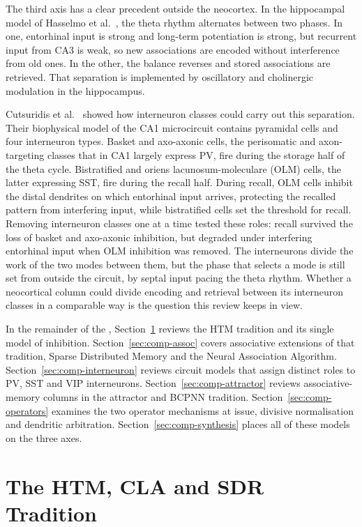 The third axis has a clear precedent outside the neocortex. In the hippocampal
model of Hasselmo et al.~\cite{hasselmo2002theta}, the theta rhythm
alternates between two phases. In one, entorhinal input is strong and
long-term potentiation is strong, but recurrent input from CA3 is weak, so new
associations are encoded without interference from old ones. In the other, the
balance reverses and stored associations are retrieved. That separation is
implemented by oscillatory and cholinergic modulation in the hippocampus.

Cutsuridis et al.~\cite{cutsuridis2010encoding} showed how interneuron classes
could carry out this separation. Their biophysical model of the CA1 microcircuit
contains pyramidal cells and four interneuron types. Basket and axo-axonic
cells, the perisomatic and axon-targeting classes that in CA1 largely express
PV, fire during the storage half of the theta cycle. Bistratified and oriens
lacunosum-moleculare (OLM) cells, the latter expressing SST, fire during the
recall half. During recall, OLM cells inhibit the distal dendrites on which
entorhinal input arrives, protecting the recalled pattern from interfering
input, while bistratified cells set the threshold for recall. Removing
interneuron classes one at a time tested these roles: recall survived the loss
of basket and axo-axonic inhibition, but degraded under interfering entorhinal
input when OLM inhibition was removed. The interneurons divide the work of the
two modes between them, but the phase that selects a mode is still set from
outside the circuit, by septal input pacing the theta rhythm. Whether a
neocortical column could divide encoding and retrieval between its interneuron
classes in a comparable way is the question this review keeps in view.

In the remainder of the \unitname{}, Section~\ref{sec:comp-htm} reviews the HTM
tradition and its single model of inhibition. Section~\ref{sec:comp-assoc}
covers associative extensions of that tradition, Sparse Distributed Memory and
the Neural Association Algorithm. Section~\ref{sec:comp-interneuron} reviews
circuit models that assign distinct roles to PV, SST and VIP interneurons.
Section~\ref{sec:comp-attractor} reviews associative-memory columns in the
attractor and BCPNN tradition. Section~\ref{sec:comp-operators} examines the
two operator mechanisms at issue, divisive normalisation and dendritic
arbitration. Section~\ref{sec:comp-synthesis} places all of these models on
the three axes.

\section{The HTM, CLA and SDR Tradition}
\label{sec:comp-htm}

